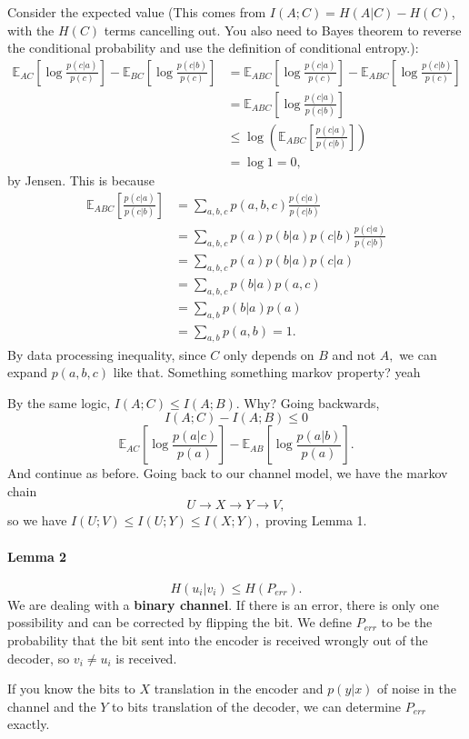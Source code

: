 \documentclass[12pt]{article}
\begin{document}
Consider the expected value (This comes from $I(A;C) = H(A|C) - H(C)$, with the $H(C)$ terms cancelling out. You also need to Bayes theorem to reverse the conditional probability and use the definition of conditional entropy.):
\begin{align*}\mathbb{E}_{AC}\left[\log\frac{p(c|a)}{p(c)}\right]-\mathbb{E}_{BC}\left[\log\frac{p(c|b)}{p(c)}\right]&=\mathbb{E}_{ABC}\left[\log\frac{p(c|a)}{p(c)}\right]-\mathbb{E}_{ABC}\left[\log\frac{p(c|b)}{p(c)}\right]\\
&=\mathbb{E}_{ABC}\left[\log\frac{p(c|a)}{p(c|b)}\right]\\
&\le\log\left(\mathbb{E}_{ABC}\left[\frac{p(c|a)}{p(c|b)}\right]\right)\\&=\log 1=0,\end{align*}
by Jensen.
This is because
\begin{align*}\mathbb{E}_{ABC}\left[\frac{p(c|a)}{p(c|b)}\right]&=\sum_{a,b,c}p(a,b,c)\frac{p(c|a)}{p(c|b)}\\
&=\sum_{a,b,c}p(a)p(b|a)p(c|b)\frac{p(c|a)}{p(c|b)}\\&=\sum_{a,b,c}p(a)p(b|a)p(c|a)\\&=\sum_{a,b,c}p(b|a)p(a,c)\\&=\sum_{a,b}p(b|a)p(a)\\&=\sum_{a,b}p(a,b)=1.\end{align*}
By data processing inequality, since $C$ only depends on $B$ and not $A,$ we can expand $p(a,b,c)$ like that. Something something markov property? yeah

By the same logic, $I(A;C)\le I(A;B).$
Why? Going backwards,
\[I(A;C)-I(A;B)\le 0\]
\[\mathbb{E}_{AC}\left[\log\frac{p(a|c)}{p(a)}\right]-\mathbb{E}_{AB}\left[\log\frac{p(a|b)}{p(a)}\right].\]
And continue as before.
Going back to our channel model, we have the markov chain
\[U\to X\to Y\to V,\] so we have
$I(U;V)\le I(U;Y)\le I(X;Y),$ proving Lemma 1.

\paragraph{Lemma 2}
\[H(u_i|v_i)\le H(P_{err}).\]
We are dealing with a \textbf{binary channel}. If there is an error, there is only one possibility and can be corrected by flipping the bit.
We define $P_{err}$ to be the probability that the bit sent into the encoder is received wrongly out of the decoder, so $v_i\ne u_i$ is received.

If you know the bits to $X$ translation in the encoder and $p(y|x)$ of noise in the channel and the $Y$ to bits translation of the decoder, we can determine $P_{err}$ exactly.
\end{document}
